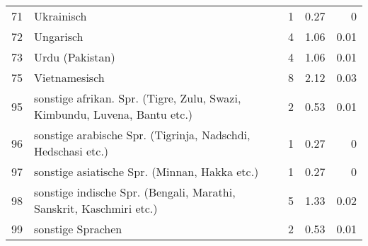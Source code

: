 \begin{longtable}{lXrrr}
        71 & \multicolumn{1}{X}{Ukrainisch} & %
          \num{1} &
          \num[round-mode=places,round-precision=2]{0.27} &
          \num[round-mode=places,round-precision=2]{0} \\

        72 & \multicolumn{1}{X}{Ungarisch} & %
          \num{4} &
          \num[round-mode=places,round-precision=2]{1.06} &
          \num[round-mode=places,round-precision=2]{0.01} \\

        73 & \multicolumn{1}{X}{Urdu (Pakistan)} & %
          \num{4} &
          \num[round-mode=places,round-precision=2]{1.06} &
          \num[round-mode=places,round-precision=2]{0.01} \\

        75 & \multicolumn{1}{X}{Vietnamesisch} & %
          \num{8} &
          \num[round-mode=places,round-precision=2]{2.12} &
          \num[round-mode=places,round-precision=2]{0.03} \\

        95 & \multicolumn{1}{X}{sonstige afrikan. Spr. (Tigre, Zulu, Swazi, Kimbundu, Luvena, Bantu etc.)} & %
          \num{2} &
          \num[round-mode=places,round-precision=2]{0.53} &
          \num[round-mode=places,round-precision=2]{0.01} \\

        96 & \multicolumn{1}{X}{sonstige arabische Spr. (Tigrinja, Nadschdi, Hedschasi etc.)} & %
          \num{1} &
          \num[round-mode=places,round-precision=2]{0.27} &
          \num[round-mode=places,round-precision=2]{0} \\

        97 & \multicolumn{1}{X}{sonstige asiatische Spr. (Minnan, Hakka etc.)} & %
          \num{1} &
          \num[round-mode=places,round-precision=2]{0.27} &
          \num[round-mode=places,round-precision=2]{0} \\

        98 & \multicolumn{1}{X}{sonstige indische Spr. (Bengali, Marathi, Sanskrit, Kaschmiri etc.)} & %
          \num{5} &
          \num[round-mode=places,round-precision=2]{1.33} &
          \num[round-mode=places,round-precision=2]{0.02} \\

        99 & \multicolumn{1}{X}{sonstige Sprachen} & %
          \num{2} &
          \num[round-mode=places,round-precision=2]{0.53} &
          \num[round-mode=places,round-precision=2]{0.01} \\


\end{longtable}
